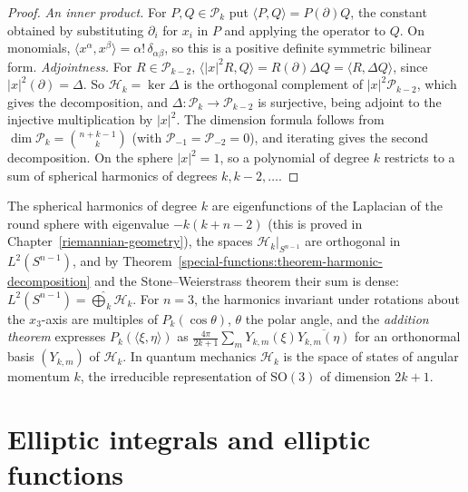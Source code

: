 \begin{proof}
\emph{An inner product.} For $P, Q \in \mathcal{P}_k$ put $\langle P, Q\rangle = P(\partial)Q$, the constant obtained by substituting $\partial_i$ for $x_i$ in $P$ and applying the operator to $Q$. On monomials,
$\langle x^\alpha, x^\beta\rangle = \alpha!\,\delta_{\alpha\beta}$, so this is a positive definite symmetric bilinear form. \emph{Adjointness.} For $R \in \mathcal{P}_{k-2}$, $\langle|x|^2R, Q\rangle = R(\partial)\Delta Q = \langle R, \Delta Q\rangle$,
since $|x|^2(\partial) = \Delta$. So $\mathcal{H}_k = \ker\Delta$ is the orthogonal complement of $|x|^2\mathcal{P}_{k-2}$, which gives the decomposition, and $\Delta \colon \mathcal{P}_k \to \mathcal{P}_{k-2}$ is surjective, being adjoint to
the injective multiplication by $|x|^2$. The dimension formula follows from $\dim\mathcal{P}_k = \binom{n + k - 1}{k}$ (with $\mathcal{P}_{-1} = \mathcal{P}_{-2} = 0$), and iterating gives the second decomposition. On the sphere $|x|^2 = 1$, so a polynomial of degree $k$
restricts to a sum of spherical harmonics of degrees $k, k - 2, \ldots$.
\end{proof}

\begin{remark}\label{special-functions:remark-spherical-harmonics}
The spherical harmonics of degree $k$ are eigenfunctions of the Laplacian of the round sphere with eigenvalue $-k(k + n - 2)$ (this is proved in Chapter~\ref{riemannian-geometry}), the
spaces $\mathcal{H}_k|_{S^{n-1}}$ are orthogonal in $L^2(S^{n-1})$, and by Theorem~\ref{special-functions:theorem-harmonic-decomposition} and the Stone--Weierstrass theorem their sum is dense: $L^2(S^{n-1}) = \widehat{\bigoplus}_k\mathcal{H}_k$.
For $n = 3$, the harmonics invariant under rotations about the $x_3$-axis are multiples of $P_k(\cos\theta)$, $\theta$ the polar angle, and the \emph{addition theorem} expresses $P_k(\langle\xi, \eta\rangle)$ as
$\frac{4\pi}{2k + 1}\sum_mY_{k,m}(\xi)\overline{Y_{k,m}(\eta)}$ for an orthonormal basis $(Y_{k,m})$ of $\mathcal{H}_k$. In quantum mechanics $\mathcal{H}_k$ is the space of states of angular momentum $k$, the irreducible representation of
$\mathrm{SO}(3)$ of dimension $2k + 1$.
\end{remark}

\section{Elliptic integrals and elliptic functions}\label{special-functions:section-elliptic}

